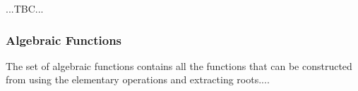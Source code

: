 ...TBC...



%






\subsubsection{Algebraic Functions}
The set of algebraic functions contains all the functions that can be constructed from using the elementary operations and extracting roots....








